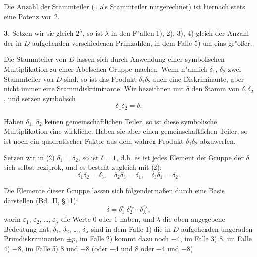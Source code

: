 \documentclass[11pt,a4paper]{article}
\theoremstyle{plain}
\newcommand{\sect}[1]{\S\,#1}
\begin{document}
Die Anzahl der Stammteiler ($1$ als Stammteiler mitgerechnet) ist hiernach stets eine Potenz von $2$.

\smallskip

\textbf{3.} Setzen wir sie gleich $2^\lambda$, so ist $\lambda$ in den F"{a}llen 1), 2), 3), 4) gleich der Anzahl der in $D$ aufgehenden verschiedenen Primzahlen, in dem Falle 5) um eins gr"{o}\ss{}er.

Die Stammteiler von $D$ lassen sich durch Anwendung einer symbolischen Multiplikation zu einer Abelschen Gruppe machen. Wenn n"{a}mlich $\delta_1$, $\delta_2$ zwei Stammteiler von $D$ sind, so ist das Produkt $\delta_1\delta_2$ auch eine Diskriminante, aber nicht immer eine Stammdiskriminante. Wir bezeichnen mit $\delta$ den Stamm von $\delta_1\delta_2$, und setzen symbolisch
\begin{equation}
\label{eq:104_2}
\delta_1 \delta_2 = \delta.
\end{equation}

\newpage
\setcounter{page}{381}

Haben $\delta_1$, $\delta_2$ keinen gemeinschaftlichen Teiler, so ist diese symbolische Multiplikation eine wirkliche. Haben sie aber einen gemeinschaftlichen Teiler, so ist noch ein quadratischer Faktor aus dem wahren Produkt $\delta_1\delta_2$ abzuwerfen.

Setzen wir in (2) $\delta_1 = \delta_2$, so ist $\delta = 1$, d.h. es ist jedes Element der Gruppe der $\delta$ sich selbst reziprok, und es besteht zugleich mit (2):
\begin{equation}
\label{eq:104_3}
\delta_1 \delta_2 = \delta_3, \quad \delta_2 \delta_3 = \delta_1, \quad \delta_3 \delta_1 = \delta_2.
\end{equation}

Die Elemente dieser Gruppe lassen sich folgenderma\ss{}en durch eine Basis darstellen (Bd.~II, \sect{11}):
\begin{equation}
\label{eq:104_4}
\delta = \delta_1^{\varepsilon_1} \delta_2^{\varepsilon_2} \cdots \delta_\lambda^{\varepsilon_\lambda},
\end{equation}
worin $\varepsilon_1$, $\varepsilon_2$, \dots, $\varepsilon_\lambda$ die Werte $0$ oder $1$ haben, und $\lambda$ die oben angegebene Bedeutung hat. $\delta_1$, $\delta_2$, \dots, $\delta_\lambda$ sind in dem Falle 1) die in $D$ aufgehenden ungeraden Primdiskriminanten $\pm p$, im Falle 2) kommt dazu noch $-4$, im Falle 3) $8$, im Falle 4) $-8$, im Falle 5) $8$ und $-8$ (oder $-4$ und $8$ oder $-4$ und $-8$).
\end{document}
